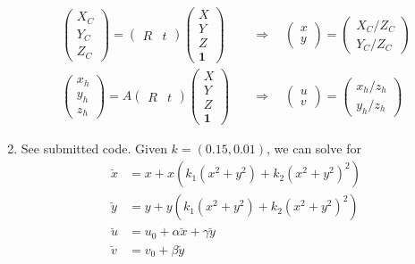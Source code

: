 \documentclass[12pt]{article}
\begin{document}
\begin{enumerate}
		\begin{align*}
			\left(\begin{array}{c}
				X_C \\
				Y_C \\
				Z_C
			\end{array}\right) = \left(\begin{array}{cc} R & t\end{array}\right)\left(\begin{array}{c}
				X \\
				Y \\
				Z \\
				\mathbf{1}
			\end{array}\right) \quad &\Rightarrow \quad \left(\begin{array}{c}
											x \\
											y
										\end{array}\right) = \left(\begin{array}{c}
											X_C/Z_C \\
											Y_C/Z_C
										\end{array}\right) \\
			\left(\begin{array}{c}
			x_h \\
			y_h \\
			z_h
			\end{array}\right) = A\left(\begin{array}{cc} R & t\end{array}\right)\left(\begin{array}{c}
			X \\
			Y \\
			Z \\
			\mathbf{1}
			\end{array}\right) \quad &\Rightarrow \quad \left(\begin{array}{c}
			u \\
			v
			\end{array}\right) = \left(\begin{array}{c}
			x_h/z_h \\
			y_h/z_h
			\end{array}\right)
		\end{align*}
	\item See submitted code. Given $k = (0.15, 0.01)$, we can solve for
		\begin{align*}
			\breve x &= x + x(k_1(x^2 + y^2) + k_2(x^2 + y^2)^2) \\
			\breve y &= y + y(k_1(x^2 + y^2) + k_2(x^2 + y^2)^2) \\
			\breve u &= u_0 + \alpha \breve x + \gamma \breve y \\
			\breve v &= v_0 + \beta \breve y
		\end{align*}
\end{enumerate}
\end{document}

